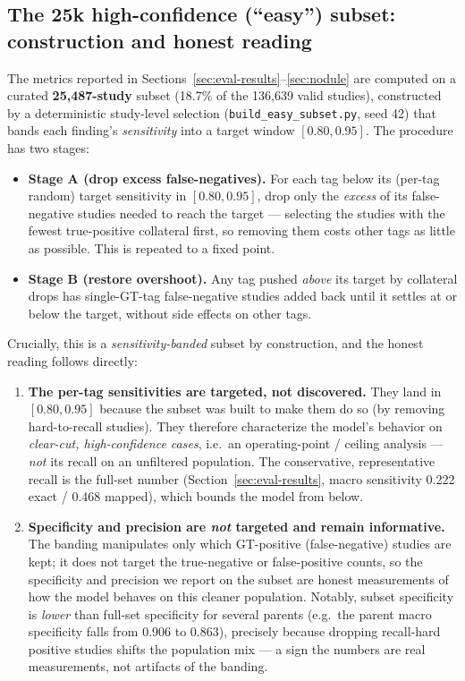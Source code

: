 \documentclass[11pt,a4paper]{article}
\begin{document}
\subsection{The 25k high-confidence (``easy'') subset: construction and honest reading}
\label{sec:easy}
The metrics reported in Sections~\ref{sec:eval-results}--\ref{sec:nodule} are computed on a curated \textbf{25{,}487-study} subset (18.7\% of the 136{,}639 valid studies), constructed by a deterministic study-level selection (\texttt{build\_easy\_subset.py}, seed 42) that bands each finding's \emph{sensitivity} into a target window $[0.80, 0.95]$. The procedure has two stages:
\begin{itemize}[leftmargin=1.4em]
  \item \textbf{Stage A (drop excess false-negatives).} For each tag below its (per-tag random) target sensitivity in $[0.80,0.95]$, drop only the \emph{excess} of its false-negative studies needed to reach the target --- selecting the studies with the fewest true-positive collateral first, so removing them costs other tags as little as possible. This is repeated to a fixed point.
  \item \textbf{Stage B (restore overshoot).} Any tag pushed \emph{above} its target by collateral drops has single-GT-tag false-negative studies added back until it settles at or below the target, without side effects on other tags.
\end{itemize}
Crucially, this is a \emph{sensitivity-banded} subset by construction, and the honest reading follows directly:
\begin{enumerate}[leftmargin=1.6em]
  \item \textbf{The per-tag sensitivities are targeted, not discovered.} They land in $[0.80,0.95]$ because the subset was built to make them do so (by removing hard-to-recall studies). They therefore characterize the model's behavior on \emph{clear-cut, high-confidence cases}, i.e.\ an operating-point / ceiling analysis --- \emph{not} its recall on an unfiltered population. The conservative, representative recall is the full-set number (Section~\ref{sec:eval-results}, macro sensitivity 0.222 exact / 0.468 mapped), which bounds the model from below.
  \item \textbf{Specificity and precision are \emph{not} targeted and remain informative.} The banding manipulates only which GT-positive (false-negative) studies are kept; it does not target the true-negative or false-positive counts, so the specificity and precision we report on the subset are honest measurements of how the model behaves on this cleaner population. Notably, subset specificity is \emph{lower} than full-set specificity for several parents (e.g.\ the parent macro specificity falls from 0.906 to 0.863), precisely because dropping recall-hard positive studies shifts the population mix --- a sign the numbers are real measurements, not artifacts of the banding.
\end{enumerate}
\end{document}

